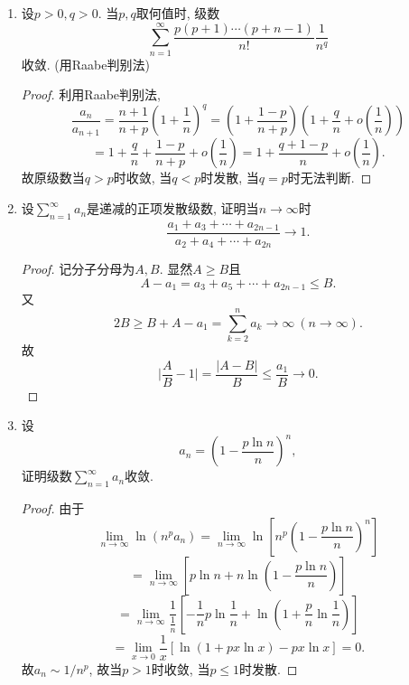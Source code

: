 \documentclass[UTF8,11pt, a4paper, oneside, fontset=none]{ctexbook}
\begin{document}
\begin{enumerate}
\begin{proof}
\end{proof}


\item 设$p>0, q>0$. 当$p, q$取何值时, 级数
\[
\sum_{n=1}^{\infty} \frac{p(p+1)\cdots (p+n-1)}{n!} \frac{1}{n^q}
\]
收敛. (用Raabe判别法)


\begin{proof}

利用Raabe判别法,
\[
\frac{a_n}{a_{n+1}} = \frac{n+1}{n+p} \left( 1 + \frac{1}{n}  \right)^q =  \left( 1 + \frac{1-p}{n+p}  \right)  \left( 1 + \frac{q}{n} + o \left( \frac{1}{n} \right) \right)
\]
\[
= 1 + \frac{q}{n} + \frac{1-p}{n+p} + o \left( \frac{1}{n} \right)= 1 + \frac{q+1-p}{n} + o \left( \frac{1}{n} \right).
\]
故原级数当$q > p$时收敛, 当$q < p$时发散, 当$q =p$时无法判断.

\end{proof}


\item 设$\sum_{n=1}^{\infty} a_n$是递减的正项发散级数, 证明当$n \to \infty$时
\[
\frac{a_1 + a_3 + \cdots + a_{2n-1}}{a_2 + a_4 + \cdots + a_{2n}} \to 1.
\]

\begin{proof}

记分子分母为$A, B$. 显然$A \geq B$且
\[
A - a_1 = a_3 + a_5 + \cdots + a_{2n-1} \leq B.
\]
又
\[
2B \geq B + A - a_1 = \sum_{k=2}^n a_k \to \infty \ (n \to \infty).
\]
故
\[
\Big| \frac{A}{B} -1 \Big| = \frac{|A-B|}{B} \leq \frac{a_1}{B} \to 0.
\]

\end{proof}


\item 设
\[
a_n = \left( 1 - \frac{p \ln n}{n} \right)^n,
\]
证明级数$\sum_{n=1}^{\infty} a_n$收敛.

\begin{proof}

由于
\[
\lim_{n \to \infty} \ln (n^p a_n) = \lim_{n \to \infty} \ln \left[  n^p  \left( 1 - \frac{p \ln n}{n} \right)^n \right]
\]
\[
= \lim_{n \to \infty} \left[ p \ln n + n \ln \left( 1 - \frac{p \ln n}{n} \right) \right]
\]
\[
= \lim_{n \to \infty} \frac{1}{\frac{1}{n}} \left[ - \frac{1}{n} p \ln \frac{1}{n} + \ln \left( 1 + \frac{p}{n} \ln \frac{1}{n} \right) \right]
\]
\[
= \lim_{x \to 0} \frac{1}{x} [ \ln(1 + px \ln x) - px \ln x] =0.
\]
故$a_n \sim 1/n^p$, 故当$p > 1$时收敛, 当$ p \leq 1$时发散.

\end{proof}

\end{enumerate}
\end{document}
